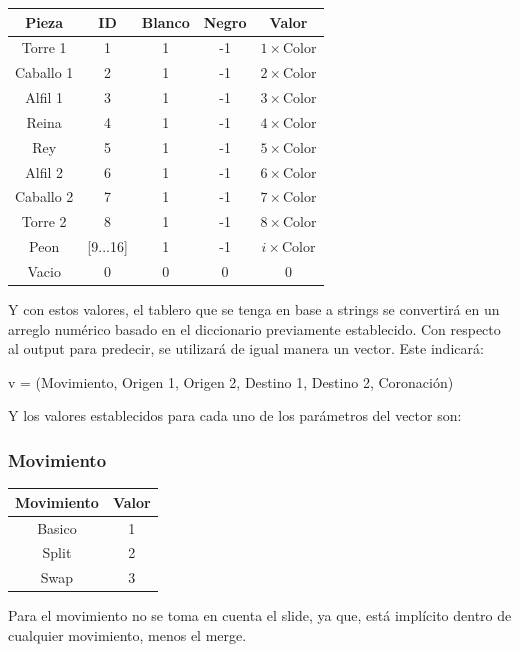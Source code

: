 \begin{tabular}{|c|c|c|c|c|}
	\hline
	\textbf{Pieza} & \textbf{ID} & \textbf{Blanco} & \textbf{Negro} & \textbf{Valor} \\ \hline
	Torre 1 & 1 & 1 & -1 & $1 \times \text{Color}$ \\ \hline
	Caballo 1 & 2 & 1 & -1 & $2 \times \text{Color}$ \\ \hline
	Alfil 1 & 3 & 1 & -1 & $3 \times \text{Color}$ \\ \hline
	Reina & 4 & 1 & -1 & $4 \times \text{Color}$ \\ \hline
	Rey & 5 & 1 & -1 & $5 \times \text{Color}$ \\ \hline
	Alfil 2 & 6 & 1 & -1 & $6 \times \text{Color}$ \\ \hline
	Caballo 2 & 7 & 1 & -1 & $7 \times \text{Color}$ \\ \hline
	Torre 2 & 8 & 1 & -1 & $8 \times \text{Color}$ \\ \hline
	Peon & [9...16] & 1 & -1 & $i \times \text{Color}$ \\ \hline
	Vacio & 0 & 0 & 0 & 0 \\ \hline
\end{tabular}

Y con estos valores, el tablero que se tenga en base a strings se convertirá en un arreglo numérico basado en el diccionario previamente establecido.
Con respecto al output para predecir, se utilizará de igual manera un vector. Este indicará:

v = (Movimiento, Origen 1, Origen 2, Destino 1, Destino 2, Coronación)

Y los valores establecidos para cada uno de los parámetros del vector son:

\subsubsection{Movimiento}
\begin{center}
	\begin{tabular}{|c|c|}
		\hline
		\textbf{Movimiento} & \textbf{Valor} \\ \hline
		Basico & 1\\ \hline
		Split  & 2 \\\hline
		Swap   & 3 \\\hline
	\end{tabular}
\end{center}
Para el movimiento no se toma en cuenta el slide, ya que, está implícito dentro de cualquier movimiento, menos el merge.

